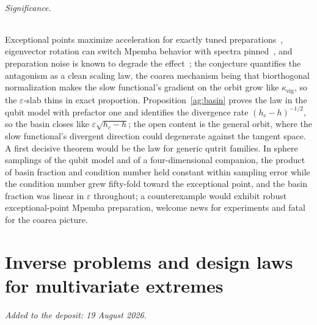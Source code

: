 \documentclass[11pt]{article}
\theoremstyle{definition}
\newcommand{\eps}{\varepsilon}
\begin{document}
\paragraph{Significance.}
Exceptional points maximize acceleration for exactly tuned preparations~\cite{ZXW25,CTH24}, eigenvector rotation can switch Mpemba behavior with spectra pinned~\cite{YZXM26}, and preparation noise is known to degrade the effect~\cite{MP26}; the conjecture quantifies the antagonism as a clean scaling law, the coarea mechanism being that biorthogonal normalization makes the slow functional's gradient on the orbit grow like $\kappa_{\mathrm{eig}}$, so the $\eps$-slab thins in exact proportion.  Proposition~\ref{ag:basin} proves the law in the qubit model with prefactor one and identifies the divergence rate $(h_c-h)^{-1/2}$, so the basin closes like $\eps\sqrt{h_c-h}$; the open content is the general orbit, where the slow functional's divergent direction could degenerate against the tangent space.  A first decisive theorem would be the law for generic qutrit families.  In sphere samplings of the qubit model and of a four-dimensional companion, the product of basin fraction and condition number held constant within sampling error while the condition number grew fifty-fold toward the exceptional point, and the basin fraction was linear in $\eps$ throughout; a counterexample would exhibit robust exceptional-point Mpemba preparation, welcome news for experiments and fatal for the coarea picture.

\part{Inverse problems and design laws for multivariate extremes}

\medskip\noindent\emph{Added to the deposit: 19 August 2026.}\par\medskip
\end{document}
